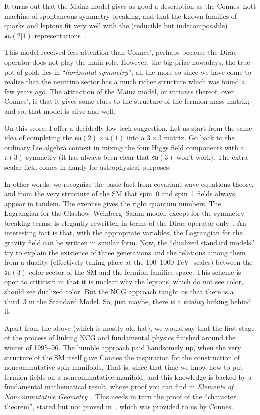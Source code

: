 \documentclass[a4paper,12pt]{article}
\newcommand{\sul}{\mathfrak{su}}    %
\DeclareMathOperator{\TeV}{TeV}     %
\newcommand{\ul}{\mathfrak{u}}      %
\newcommand{\x}{\times}             %
\newcommand{\1}{\mathbf{1}}         %
\newcommand{\7}{\dagger}            %
\newcommand{\8}{\bullet}            %
\renewcommand{\.}{\cdot}            %
\renewcommand{\:}{\colon}           %
\begin{document}
It turns out that the Mainz model gives as good a description as the
Connes--Lott machine of spontaneous symmetry breaking, and that the
known families of quarks and leptons fit very well with the (reducible
but indecomposable) $\sul(2|1)$ representations~\cite{Scheck}.

This model received less attention than Connes', perhaps because the
Dirac operator does not play the main role. However, the big prize
nowadays, the true pot of gold, lies in ``\textit{horizontal
symmetry}''; all the more so since we have come to realize that the
neutrino sector has a much richer structure which was found a few
years ago. The attraction of the Mainz model, or variants thereof,
over Connes', is that it gives some clues to the structure of the
fermion mass matrix; and so, that model is alive and well.

On this score, I offer a decidedly low-tech suggestion. Let us start
from the same idea of completing the $\sul(2) \x \ul(1)$ into a
$3 \x 3$ matrix. Go back to the ordinary Lie algebra context in mixing
the four Higgs field components with a $\ul(3)$ symmetry (it has
always been clear that $\sul(3)$ won't work). The extra scalar field
comes in handy for astrophysical purposes.

In other words, we recognize the basic fact from covariant wave
equations theory, and from the very structure of the SM that spin~0
and spin~1 fields always appear in tandem. The exercise gives the
right quantum numbers. The Lagrangian for the Glashow--Weinberg--Salam
model, except for the symmetry-breaking terms, is elegantly rewritten
in terms of the Dirac operator only~\cite{ChavesM}. An interesting
fact is that, with the appropriate variables, the Lagrangian for the
gravity field can be written in similar form. Now, the ``dualized
standard models'' try to explain the existence of three generations
and the relations among them from a duality (effectively taking place
at the 100--$1000 \TeV$ scales) between the $\sul(3)$ color sector of
the SM and the fermion families space. This scheme is open to
criticism in that it is unclear why the leptons, which do not see
color, should see dualized color. But the NCG approach taught us that
there is a third~3 in the Standard Model. So, just maybe, there is a
\textit{triality} lurking behind it.

Apart from the above (which is mostly old hat), we would say that the
first stage of the process of linking NCG and fundamental physics
finished around the winter of 1995--96. The humble approach paid
handsomely up, when the very structure of the SM itself gave
Connes the inspiration for the construction of noncommutative spin
manifolds. That is, since that time we know how to put fermion fields
on a noncommutative manifold, and this knowledge is backed by a
fundamental mathematical result, whose proof you can find in
{\it Elements of Noncommutative Geometry\/}~\cite{Polaris}. This needs
in turn the proof of the ``character theorem'', stated but not proved
in~\cite{Book}, which was provided to us by Connes.
\end{document}

